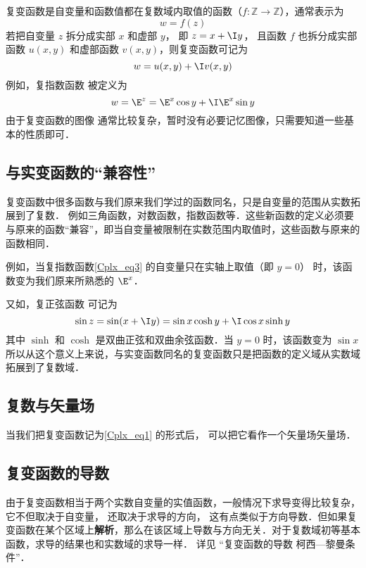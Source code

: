 

复变函数是自变量和函数值都在复数域内取值的函数（$f:\mathbb Z \to \mathbb Z$），通常表示为
\begin{equation}
w = f(z)
\end{equation}
若把自变量 $z$ 拆分成实部 $x$ 和虚部 $y$， 即 $z = x + \I y$， 且函数 $f$ 也拆分成实部函数 $u(x,y)$ 和虚部函数 $v(x,y)$，则复变函数可记为
\begin{equation}\label{Cplx_eq1}
w = u(x,y) + \I v(x,y)
\end{equation}
例如，复指数函数 被定义为
\begin{equation}\label{Cplx_eq3}
w = \E^z = \E^x \cos y + \I \E^x\sin y
\end{equation}
由于复变函数的图像%
通常比较复杂，暂时没有必要记忆图像，只需要知道一些基本的性质即可．

\subsection{与实变函数的“兼容性”}
复变函数中很多函数与我们原来我们学过的函数同名，只是自变量的范围从实数拓展到了复数． 例如三角函数，对数函数，指数函数等．这些新函数的定义必须要与原来的函数“兼容”，即当自变量被限制在实数范围内取值时，这些函数与原来的函数相同．

例如，当复指数函数\autoref{Cplx_eq3} 的自变量只在实轴上取值（即 $y = 0$） 时，该函数变为我们原来所熟悉的 $\E^x$． 

又如，复正弦函数 可记为
\begin{equation}
\sin z = \sin(x + \I y) = \sin x\cosh y + \I\cos x\sinh y
\end{equation}
其中 $\sinh $ 和 $\cosh $ 是双曲正弦和双曲余弦函数．当 $y = 0$ 时，该函数变为 $\sin x$ 
所以从这个意义上来说，与实变函数同名的复变函数只是把函数的定义域从实数域拓展到了复数域．

\subsection{复数与矢量场}
当我们把复变函数记为\autoref{Cplx_eq1} 的形式后， 可以把它看作一个矢量场矢量场．

\subsection{复变函数的导数}
由于复变函数相当于两个实数自变量的实值函数，一般情况下求导变得比较复杂， 它不但取决于自变量， 还取决于求导的方向， 这有点类似于方向导数．但如果复变函数在某个区域上\textbf{解析}，那么在该区域上导数与方向无关．对于复数域初等基本函数，求导的结果也和实数域的求导一样． 详见 “复变函数的导数 柯西—黎曼条件”．

